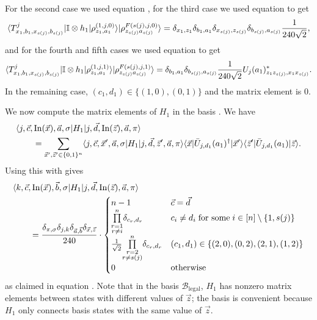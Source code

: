 \documentclass[../thesis-main/thesis-main]{subfiles}
\begin{document}
For the second case we used equation , for the third case we used equation  to get
\begin{equation}
\langle T_{x_{1},b_{1},x_{s(j)},b_{s(j)}}^{j}|\mathbb{I}\otimes h_{1}|\rho_{z_{1},a_{1}}^{(1,j,0)}\rangle|\rho_{z_{s(j)}a_{s(j)}}^{F(s(j),j,0)}\rangle=\delta_{x_1,z_1}\delta_{b_1,a_1}\delta_{x_{s(j)},z_{s(j)}}\delta_{b_{s(j)},a_{s(j)}}\frac{1}{240\sqrt{2}},
\end{equation}
and for the fourth and fifth cases we used equation  to get
\begin{equation}
\langle T_{x_{1},b_{1},x_{s(j)},b_{s(j)}}^{j}|\mathbb{I}\otimes h_{1}|\rho_{z_{1},a_{1}}^{(1,j,1)}\rangle|\rho_{z_{s(j)}a_{s(j)}}^{F(s(j),j,1)}\rangle=\delta_{b_1,a_1}\delta_{b_{s(j)},a_{s(j)}}\frac{1}{240\sqrt{2}} U_{j}(a_{1})^{*}_{z_{1}z_{s(j)},x_{1}x_{s(j)}}.
\end{equation}
In the remaining case, $(c_1,d_1) \in \{(1,0),(0,1)\}$ and the matrix element is $0$.



We now compute the matrix elements of $H_1$ in the basis . We have
\begin{align}
&\langle j,\vec{c},\operatorname{In}(\vec{x}),\vec{a},\sigma|H_1|j,\vec{d},\operatorname{In}(\vec{z}),\vec{a},\pi\rangle\nonumber\\
&\qquad= \sum_{\vec{x}',\vec{z}' \in \{0,1\}^n}
  \langle j,\vec{c},\vec{x}',\vec{a},\sigma|H_1|j,\vec{d},\vec{z}',\vec{a},\pi\rangle
  \langle \vec{x}|\bar{U}_{j,d_1}(a_1)^\dag|\vec{x}'\rangle
  \langle \vec{z}'|\bar{U}_{j,d_1}(a_1)|\vec{z}\rangle.
\label{eq:basischange}
\end{align}
Using this with  gives
\begin{align}
&\langle k,\vec{c},\operatorname{In}(\vec{x}),\vec{b},\sigma|H_{1}|j,\vec{d},\operatorname{In}(\vec{z}),\vec{a},\pi\rangle\nonumber\\
&\qquad=\frac{\delta_{\pi,\sigma}\delta_{j,k}\delta_{\vec{a},\vec{b}}\delta_{\vec{x},\vec{z}}}{240}\cdot\begin{cases}
n-1& \vec{c}=\vec{d}\\
\underset{\substack{r=1\\
r\neq i
}
}{\overset{n}{\prod}}\delta_{c_{r},d_{r}} & c_{i}\neq d_{i}\;\text{for some}\; i\in[n]\setminus\{1,s(j)\}\\
\frac{1}{\sqrt{2}}\underset{\substack{r=2\\
r\neq s(j)
}
}{\overset{n}{\prod}}\delta_{c_{r},d_{r}} & (c_{1},d_{1})\in\{(2,0),(0,2),(2,1),(1,2)\}\\
0 & \text{otherwise}
\end{cases}
\end{align}
as claimed in equation . Note that in the basis $\mathcal{B}_{{\text{legal}}}$, $H_{1}$ has nonzero matrix elements between states with different values of $\vec{z}$; the basis  is convenient because $H_{1}$ only connects basis states with the same value of $\vec{z}$.
\end{document}
